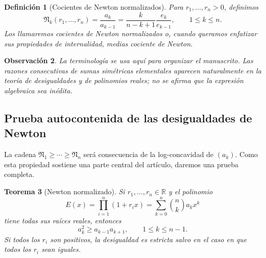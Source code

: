 \documentclass[11pt,oneside]{scrartcl}
\theoremstyle{plainblue}
\newtheorem{theorem}{Teorema}[section]
\theoremstyle{definitionblue}
\newtheorem{definition}[theorem]{Definición}
\theoremstyle{remarkgray}
\newtheorem{remark}[theorem]{Observación}
\newcommand{\RR}{\mathbb{R}}
\newcommand{\cN}{\mathfrak{N}}
\begin{document}
\begin{definition}[Cocientes de Newton normalizados]\label{def:newton-quotient-means}
Para \(r_1,\dots,r_n>0\), definimos
\begin{equation}\label{eq:Nk}
\boxed{
\cN_k(r_1,\dots,r_n)
=\frac{a_k}{a_{k-1}}
=\frac{k}{n-k+1}\frac{e_k}{e_{k-1}}},
\qquad 1\le k\le n.
\end{equation}
Los llamaremos \emph{cocientes de Newton normalizados} o, cuando queramos enfatizar
sus propiedades de internalidad, \emph{medias cociente de Newton}.
\end{definition}

\begin{remark}
La terminología se usa aquí para organizar el manuscrito. Las razones consecutivas de
sumas simétricas elementales aparecen naturalmente en la teoría de desigualdades y de
polinomios reales; no se afirma que la expresión algebraica sea inédita.
\end{remark}

\subsection{Prueba autocontenida de las desigualdades de Newton}

La cadena \(\cN_1\ge\cdots\ge\cN_n\) será consecuencia de la log-concavidad de
\((a_k)\). Como esta propiedad sostiene una parte central del artículo, daremos una
prueba completa.

\begin{theorem}[Newton normalizado]\label{thm:newton}
Si \(r_1,\dots,r_n\in\RR\) y el polinomio
\[
E(x)=\prod_{i=1}^{n}(1+r_i x)
=\sum_{k=0}^{n}\binom nk a_kx^k
\]
tiene todas sus raíces reales, entonces
\begin{equation}\label{eq:newton-logconcave}
a_k^2\ge a_{k-1}a_{k+1},
\qquad 1\le k\le n-1.
\end{equation}
Si todos los \(r_i\) son positivos, la desigualdad es estricta salvo en el caso en que
todos los \(r_i\) sean iguales.
\end{theorem}
\end{document}
